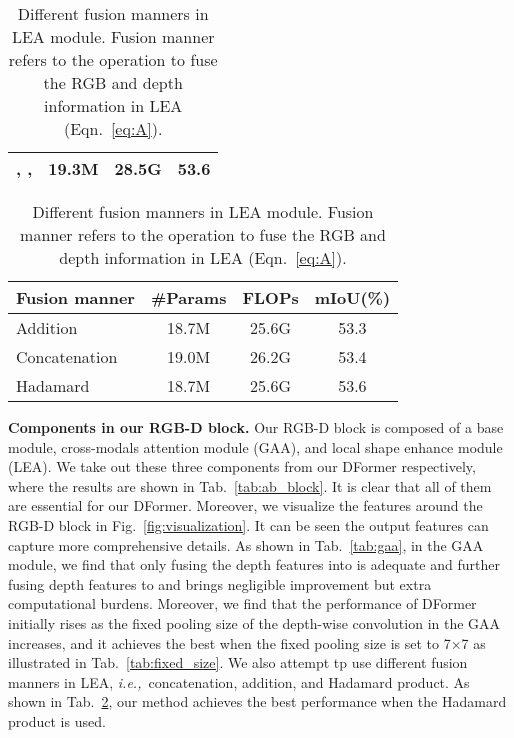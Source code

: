 \documentclass{article}
\newcommand{\tablestyle}[2]{\footnotesize \setlength{\tabcolsep}{#1}\renewcommand{\arraystretch}{#2}\centering}
\newcommand{\figref}[1]{Fig.~\ref{#1}}
\newcommand{\tabref}[1]{Tab.~\ref{#1}}
\newcommand{\eqnref}[1]{Eqn.~\ref{#1}}
\newcommand{\myPara}[1]{\vspace{5pt}\noindent\textbf{#1}}
\def\ie{\emph{i.e.,~}}
\newcommand{\nMethod}{DFormer}
\begin{document}
\begin{table}[t]
\begin{minipage}{0.48\linewidth}
\begin{tabular}{cccc}
    , , & 19.3M & 28.5G &  53.6 \\ \bottomrule
  \end{tabular}
  \end{minipage}
  \hfill
  \begin{minipage}{0.49\linewidth}
  \vspace{10pt}
  \caption{Different fusion manners in LEA module. 
    Fusion manner refers to the operation to fuse the RGB and depth 
    information in LEA (\eqnref{eq:A}).  
  }\label{tab:lse}
  \vspace{-5pt}
  \tablestyle{5pt}{1}
  \begin{tabular}{lccc} \toprule
    Fusion manner& \textbf{\#Params}  & \textbf{FLOPs} & \textbf{mIoU}\textbf{(\%)} \\ \midrule\midrule
    Addition& 18.7M & 25.6G & 53.3 \\
    Concatenation& 19.0M & 26.2G & 53.4 \\
    Hadamard&18.7M&25.6G&53.6\\ \bottomrule
  \end{tabular}
  \end{minipage}
  \vspace{-15pt}
\end{table}

   

\myPara{Components in our RGB-D block.}
Our RGB-D block is composed of a base module, cross-modals attention module (GAA), and local shape enhance module (LEA).
We take out these three components from our \nMethod{} respectively, where the results
are shown in \tabref{tab:ab_block}.
It is clear that all of them are essential for our \nMethod{}.
Moreover, we visualize the features around the RGB-D block in \figref{fig:visualization}.
It can be seen the output features can capture more comprehensive details.  
As shown in \tabref{tab:gaa}, in the GAA module, we find that only fusing the depth features into  is adequate and further fusing depth features to  and  brings negligible improvement but extra computational burdens.
Moreover, we find that the performance of \nMethod{} initially rises as the fixed pooling size of the depth-wise convolution in the GAA increases, and it achieves the best when the fixed pooling size is set to 7×7 as illustrated in \tabref{tab:fixed_size}. 
We also attempt tp use different fusion manners in LEA, \ie concatenation, addition, and Hadamard product.
As shown in \tabref{tab:lse}, our method achieves the best performance when the Hadamard product is used.
\end{document}
